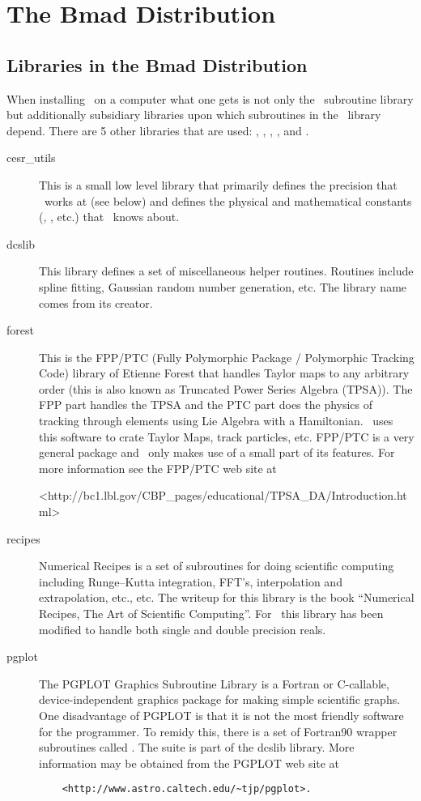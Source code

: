\chapter{The Bmad Distribution}

\section{Libraries in the Bmad Distribution}

When installing \bmad\ on a computer what one gets is not only the
\bmad\ subroutine library but additionally subsidiary libraries upon
which subroutines in the \bmad\ library depend. There are 5 other
libraries that are used: , ,
, , and .
\begin{description}
\item[cesr\_utils] This is a small low level library that primarily defines 
the precision that \bmad\ works at (see below) and defines the physical
and mathematical constants (, , etc.) that \bmad\ knows
about.
\item[dcslib] This library defines a set of miscellaneous helper routines. 
Routines include spline fitting, Gaussian random number generation,
etc. The library name comes from its creator.
\item[forest] This is the FPP/PTC 
(Fully Polymorphic Package / Polymorphic Tracking Code) library of
Etienne Forest that handles Taylor maps to any arbitrary order (this
is also known as Truncated Power Series Algebra (TPSA)). The FPP part
handles the TPSA and the PTC part does the physics of tracking through
elements using Lie Algebra with a Hamiltonian.  \bmad\ uses this
software to crate Taylor Maps, track particles, etc.  FPP/PTC is a
very general package and \bmad\ only makes use of a small part of its
features. For more information see the FPP/PTC web site at
\begin{example} 
    <http://bc1.lbl.gov/CBP_pages/educational/TPSA_DA/Introduction.html>
\end{example}
\item[recipes] Numerical Recipes is a set of subroutines for doing 
scientific computing including Runge--Kutta integration, FFT's,
interpolation and extrapolation, etc., etc. The writeup for this
library is the book ``Numerical Recipes, The Art of Scientific
Computing''\cite{?}. For \bmad\ this library has been modified to handle
both single and double precision reals.
\item[pgplot] The PGPLOT Graphics Subroutine Library is a Fortran or 
C-callable, device-independent graphics package for making simple
scientific graphs.  One disadvantage of PGPLOT is that it is not the
most friendly software for the programmer. To remidy this, there is a
set of Fortran90 wrapper subroutines called . The
 suite is part of the dcslib library. More information
may be obtained from the PGPLOT web site at
\begin{verbatim}
    <http://www.astro.caltech.edu/~tjp/pgplot>.
\end{verbatim}

\end{description}

